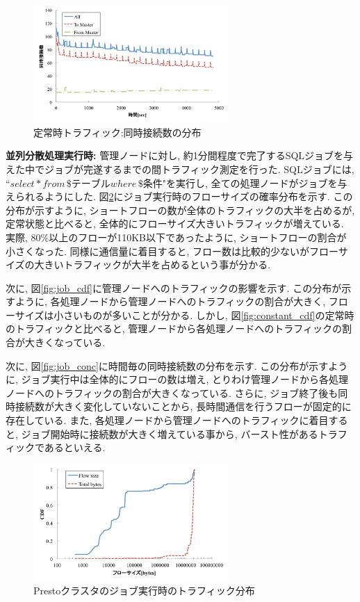 \documentclass[11pt, a4paper, twocolumn]{jsarticle}
\begin{document}
\begin{figure}[t]
    \begin{center}
    \includegraphics[autoebb, width=210pt]{./img/constant_conc.pdf}
    \caption{定常時トラフィック:同時接続数の分布}
    \label{fig:constant_conc}
    \end{center}
\end{figure}

{\bf 並列分散処理実行時: }
管理ノードに対し, 約1分間程度で完了するSQLジョブを与えた中でジョブが完遂するまでの間トラフィック測定を行った.
SQLジョブには, ``$select * from \, \$テーブル where \, \$条件$"を実行し,
全ての処理ノードがジョブを与えられるようにした.
図\ref{fig:job}にジョブ実行時のフローサイズの確率分布を示す.
この分布が示すように, ショートフローの数が全体のトラフィックの大半を占めるが, 定常状態と比べると,
全体的にフローサイズ大きいトラフィックが増えている.
実際, 80\%以上のフローが110KB以下であったように, ショートフローの割合が小さくなった.
同様に通信量に着目すると, フロー数は比較的少ないがフローサイズの大きいトラフィックが大半を占めるという事が分かる.

次に, 図\ref{fig:job_cdf}に管理ノードへのトラフィックの影響を示す.
この分布が示すように, 各処理ノードから管理ノードへのトラフィックの割合が大きく, フローサイズは小さいものが多いことが分かる.
しかし, 図\ref{fig:constant_cdf}の定常時のトラフィックと比べると,
管理ノードから各処理ノードへのトラフィックの割合が大きくなっている.

次に, 図\ref{fig:job_conc}に時間毎の同時接続数の分布を示す.
この分布が示すように, ジョブ実行中は全体的にフローの数は増え, とりわけ管理ノードから各処理ノードへのトラフィックの割合が大きくなっている.
さらに, ジョブ終了後も同時接続数が大きく変化していないことから, 長時間通信を行うフローが固定的に存在している.
また, 各処理ノードから管理ノードへのトラフィックに着目すると, ジョブ開始時に接続数が大きく増えている事から, バースト性があるトラフィックであるといえる.

\begin{figure}[t]
    \begin{center}
    \includegraphics[autoebb, width=210pt]{./img/job.pdf}
    \caption{Prestoクラスタのジョブ実行時のトラフィック分布}
    \label{fig:job}
    \end{center}
\end{figure}
\end{document}
